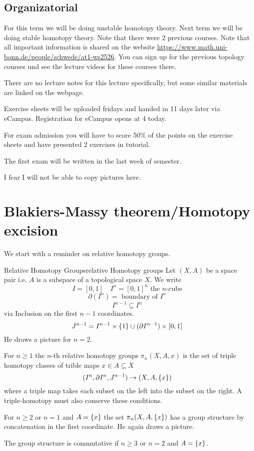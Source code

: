 \documentclass[language=english]{TemplateLecture}
\begin{document}
\subsection*{Organizatorial}

For this term we will be doing unstable homotopy theory. Next term we will be doing stable homotopy theory. Note that there were 2 previous courses. Note that all important information is shared on the website \url{https://www.math.uni-bonn.de/people/schwede/at1-ws2526}. You can sign up for the previous topology courses und see the lecture videos for these courses there.

There are no lecture notes for this lecture specifically, but some similar materials are linked on the webpage.

Exercise sheets will be uploaded fridays and handed in 11 days later via eCampus. Registration for eCampus opens at 4 today.

For exam admission you will have to score 50\% of the points on the exercise sheets and have presented 2 exercises in tutorial.

The first exam will be written in the last week of semester.

I fear I will not be able to copy pictures here.

\newpage

\setcounter{chapter}{1}

\section{Blakiers-Massy theorem/Homotopy excision}

We start with a reminder on relative homotopy groups.

\begin{defi}{Relative Homotopy Groups}{relative Homotopy groups}
    Let \((X,A)\) be a space pair i.e. \(A\) is a subspace of a topological space \(X\). We write
    \[I = [0,1] \quad I^{n} = [0,1]^n \text{ the } n\text{-cube}\]
    \[\partial(I^n) = \text{ boundary of } I^n\]
    \[I^{n-1} \subseteq I^n\]
    via Inclusion on the first \(n-1\) coordinates.
    \[J^{n-1} = I^{n-1}\times \{1\} \cup (\partial I^{n-1})\times [0,1]\]
    He draws a picture for \(n = 2\).

    For \(n \geq 1\) the \(n\)-th relative homotopy groups \(\pi_n(X,A,x)\) is the set of triple homotopy classes of trible maps \(x \in A\subseteq X\)
    \[(I^n, \partial I^n,J^{n-1}) \to (X,A, \{x\})\]
    where a triple map takes each subset on the left into the subset on the right. A triple-homotopy must also conserve these conditions.

    For \(n \geq 2\) or \(n = 1\) and \(A = \{x\}\) the set \(\pi_n(X,A,\{x\})\) has a group structure by concatenation in the first coordinate. He again draws a picture.

    The group structure is commutative if \(n \geq 3\) or \(n = 2\) and \(A = \{x\}\).
\end{defi}
\end{document}
